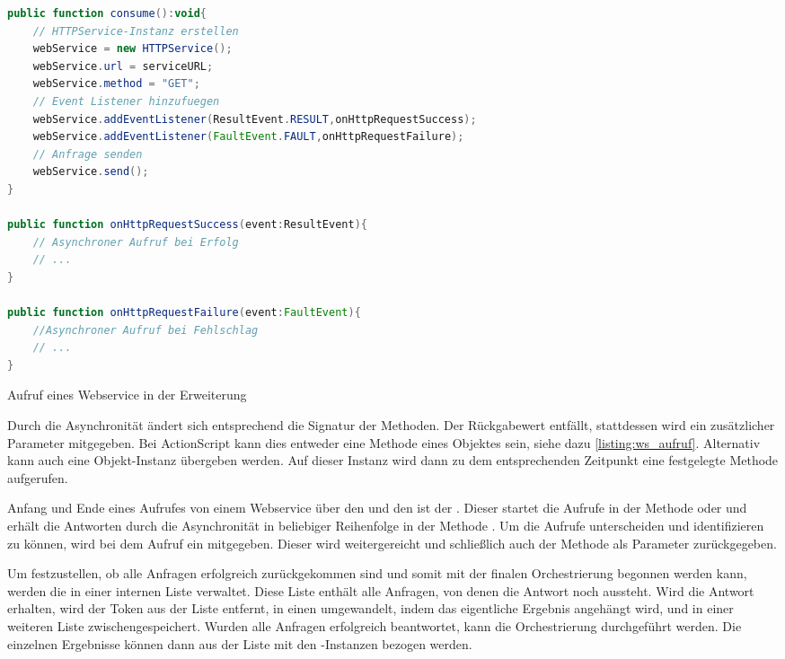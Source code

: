 \begin{onehalfspacing}
\begin{programm}[h] %
\begin{lstlisting}[language=ActionScript]
public function consume():void{
	// HTTPService-Instanz erstellen
	webService = new HTTPService();
	webService.url = serviceURL;       
	webService.method = "GET";
	// Event Listener hinzufuegen
	webService.addEventListener(ResultEvent.RESULT,onHttpRequestSuccess);
	webService.addEventListener(FaultEvent.FAULT,onHttpRequestFailure);
	// Anfrage senden
	webService.send();
}
		
public function onHttpRequestSuccess(event:ResultEvent){
	// Asynchroner Aufruf bei Erfolg
	// ...
}
		
public function onHttpRequestFailure(event:FaultEvent){
	//Asynchroner Aufruf bei Fehlschlag
	// ...
}
\end{lstlisting}
\caption{Aufruf eines Webservice in der Erweiterung\label{listing:ws_aufruf}}
\end{programm}

Durch die Asynchronität ändert sich entsprechend die Signatur der Methoden. Der Rückgabewert entfällt, stattdessen wird ein zusätzlicher Parameter mitgegeben. Bei ActionScript kann dies entweder eine Methode eines Objektes sein, siehe dazu \vref{listing:ws_aufruf}. Alternativ kann auch eine Objekt-Instanz übergeben werden. Auf dieser Instanz wird dann zu dem entsprechenden Zeitpunkt eine festgelegte Methode aufgerufen.

Anfang und Ende eines Aufrufes von einem Webservice über den  und den  ist der . Dieser startet die Aufrufe in der Methode  oder  und erhält die Antworten durch die Asynchronität in beliebiger Reihenfolge in der Methode . Um die Aufrufe unterscheiden und identifizieren zu können, wird bei dem Aufruf ein  mitgegeben. Dieser wird weitergereicht und schließlich auch der Methode  als Parameter zurückgegeben.

Um festzustellen, ob alle Anfragen erfolgreich zurückgekommen sind und somit mit der finalen Orchestrierung begonnen werden kann, werden die  in einer internen Liste verwaltet. Diese Liste enthält alle Anfragen, von denen die Antwort noch aussteht.  Wird die Antwort erhalten, wird der Token aus der Liste entfernt, in einen  umgewandelt, indem das eigentliche Ergebnis angehängt wird, und in einer weiteren Liste zwischengespeichert. Wurden alle Anfragen erfolgreich beantwortet, kann die Orchestrierung durchgeführt werden. Die einzelnen Ergebnisse können dann aus der Liste mit den -Instanzen bezogen werden.


\end{onehalfspacing}
